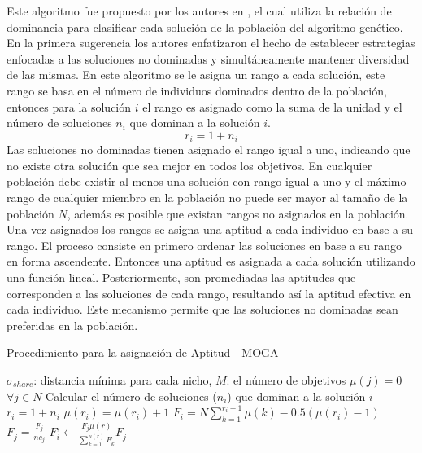Este algoritmo fue propuesto por los autores \citeauthor{Joel:MOGA} en \citeyear{Joel:MOGA}, el cual utiliza la relación de dominancia para clasificar cada solución de la población del algoritmo genético.
%
En la primera sugerencia los autores enfatizaron el hecho de establecer estrategias enfocadas a las soluciones no dominadas y simultáneamente mantener diversidad de las mismas. 
%
En este algoritmo se le asigna un rango a cada solución, este rango se basa en el número de individuos dominados dentro de la población, entonces para la solución $i$ el rango es asignado como la suma de la unidad y el número de soluciones $n_i$ que dominan a la solución $i$.
\begin{equation}
r_i  = 1 + n_i
\end{equation}
Las soluciones no dominadas tienen asignado el rango igual a uno, indicando que no existe otra solución que sea mejor en todos los objetivos.
%
En cualquier población debe existir al menos una solución con rango igual a uno y el máximo rango de cualquier miembro en la población no puede ser mayor al tamaño de la población $N$, además es posible que existan rangos no asignados en la población.
%
Una vez asignados los rangos se asigna una aptitud a cada individuo en base a su rango.
%
El proceso consiste en primero ordenar las soluciones en base a su rango en forma ascendente.
%
Entonces una aptitud es asignada a cada solución utilizando una función lineal. 
%
Posteriormente, son promediadas las aptitudes que corresponden a las soluciones de cada rango, resultando así la aptitud efectiva en cada individuo.
%
Este mecanismo permite que las soluciones no dominadas sean preferidas en la población.  

\begin{algorithm}[H]
  \scriptsize
	\caption{Procedimiento para la asignación de Aptitud - MOGA} 
	\begin{algorithmic}[1]
    \STATE $\sigma_{share}$: distancia mínima para cada nicho, $M$: el número de objetivos
    \STATE $\mu (j) = 0$ $\forall j \in N$
    \STATE Calcular el número de soluciones ($n_i$) que dominan a la solución $i$ 
	\STATE $r_i = 1+ n_i$
    \STATE $\mu(r_i)=\mu(r_i) + 1$
    \ENDFOR
{}
    \STATE $F_i = N \sum_{k=1}^{r_i - 1} \mu(k) - 0.5(\mu( r_i)-1)$
    \STATE $F_j^, = \frac{F_j}{nc_j} $
    \STATE $F_i^, \leftarrow  \frac{F_j \mu(r)}{  \sum_{k=1}^{\mu(r)} F_k^,  } F_j^,$
 \ENDFOR
    \end{algorithmic}
    \label{alg1}
\end{algorithm}


